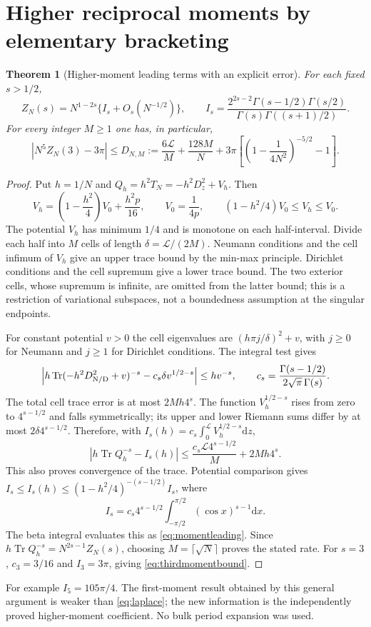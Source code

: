 \documentclass[10pt]{article}
\newtheorem{theorem}{Theorem}
\newcommand{\dd}{\mathrm d}
\begin{document}
\section{Higher reciprocal moments by elementary bracketing}

\begin{theorem}[Higher-moment leading terms with an explicit error]
For each fixed $s>1/2$,
\begin{equation}
Z_N(s)=N^{1-2s}\{I_s+O_s(N^{-1/2})\},\qquad
I_s=\frac{2^{2s-2}\Gamma(s-1/2)\Gamma(s/2)}
{\Gamma(s)\Gamma((s+1)/2)}.
\label{eq:momentleading}
\end{equation}
For every integer $M\ge1$ one has, in particular,
\begin{equation}
\left|N^5Z_N(3)-3\pi\right|\le D_{N,M}:=
\frac{6\mathcal L}{M}+\frac{128M}{N}
+3\pi\left[\left(1-\frac1{4N^2}\right)^{-5/2}-1\right].
\label{eq:thirdmomentbound}
\end{equation}
\end{theorem}
\begin{proof}
Put $h=1/N$ and $Q_h=h^2T_N=-h^2D_z^2+V_h$. Then
\[
V_h=\left(1-\frac{h^2}{4}\right)V_0+\frac{h^2p}{16},
\qquad V_0=\frac1{4p},\qquad
(1-h^2/4)V_0\le V_h\le V_0.
\]
The potential $V_h$ has minimum $1/4$ and is monotone on
each half-interval. Divide each half into $M$ cells of length
$\delta=\mathcal L/(2M)$. Neumann conditions and the cell infimum
of $V_h$ give an upper trace bound by the min-max principle.
Dirichlet conditions and the cell supremum give a lower trace
bound. The two exterior cells, whose supremum is infinite, are
omitted from the latter bound; this is a restriction of variational
subspaces, not a boundedness assumption at the singular endpoints.

For constant potential $v>0$ the cell eigenvalues are
$(h\pi j/\delta)^2+v$, with $j\ge0$ for Neumann and $j\ge1$
for Dirichlet conditions. The integral test gives
\[
\left|h\operatorname{Tr}(-h^2D_{\rm N/D}^2+v)^{-s}
-c_s\delta v^{1/2-s}\right|\le hv^{-s},
\qquad c_s=\frac{\Gamma(s-1/2)}{2\sqrt\pi\,\Gamma(s)}.
\]
The total cell trace error is at most $2Mh4^s$.
The function $V_h^{1/2-s}$ rises from zero to $4^{s-1/2}$
and falls symmetrically; its upper and lower Riemann sums differ
by at most $2\delta4^{s-1/2}$. Therefore, with
$I_s(h)=c_s\int_0^{\mathcal L}V_h^{1/2-s}\dd z$,
\[
\left|h\operatorname{Tr}Q_h^{-s}-I_s(h)\right|
\le\frac{c_s\mathcal L4^{s-1/2}}{M}+2Mh4^s.
\]
This also proves convergence of the trace. Potential comparison
gives $I_s\le I_s(h)\le(1-h^2/4)^{-(s-1/2)}I_s$, where
\[
I_s=c_s4^{s-1/2}\int_{-\pi/2}^{\pi/2}
(\cos x)^{s-1}\dd x.
\]
The beta integral evaluates this as \eqref{eq:momentleading}.
Since $h\operatorname{Tr}Q_h^{-s}=N^{2s-1}Z_N(s)$,
choosing $M=\lceil\sqrt N\rceil$ proves the stated rate.
For $s=3$, $c_3=3/16$ and $I_3=3\pi$, giving
\eqref{eq:thirdmomentbound}.
\end{proof}
For example $I_5=105\pi/4$. The first-moment result obtained
by this general argument is weaker than \eqref{eq:laplace};
the new information is the independently proved higher-moment
coefficient. No bulk period expansion was used.
\end{document}
